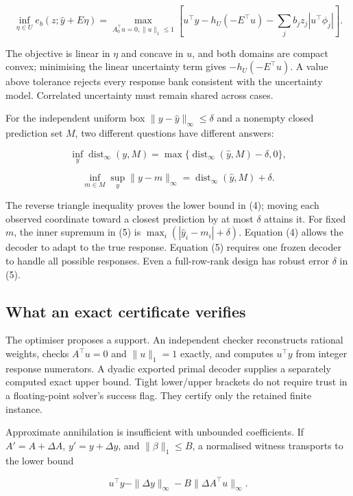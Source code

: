 \documentclass[
  british,
  11pt,
  a4paper,
]{article}
\newcounter{none} %
\begin{document}
\[
\inf_{\eta\in U}e_b(z;\widehat y+E\eta)=
\max_{A_0^\top u=0,\|u\|_1\le1}
\left[u^\top\widehat y-h_U(-E^\top u)-\sum_jb_jz_j|u^\top\phi_j|\right].
\tag{3}
\]

The objective is linear in \(\eta\) and concave in \(u\), and both
domains are compact convex; minimising the linear uncertainty term gives
\(-h_U(-E^\top u)\). A value above tolerance rejects every response bank
consistent with the uncertainty model. Correlated uncertainty must
remain shared across cases.

For the independent uniform box \(\|y-\widehat y\|_\infty\le\delta\) and
a nonempty closed prediction set \(M\), two different questions have
different answers:

\[
\inf_y\operatorname{dist}_\infty(y,M)=\max\{\operatorname{dist}_\infty(\widehat y,M)-\delta,0\},
\tag{4}
\]

\[
\inf_{m\in M}\sup_y\|y-m\|_\infty=\operatorname{dist}_\infty(\widehat y,M)+\delta.
\tag{5}
\]

The reverse triangle inequality proves the lower bound in (4); moving
each observed coordinate toward a closest prediction by at most
\(\delta\) attains it. For fixed \(m\), the inner supremum in (5) is
\(\max_i(|\widehat y_i-m_i|+\delta)\). Equation (4) allows the decoder
to adapt to the true response. Equation (5) requires one frozen decoder
to handle all possible responses. Even a full-row-rank design has robust
error \(\delta\) in (5).

\subsection{What an exact certificate
verifies}\label{what-an-exact-certificate-verifies}

The optimiser proposes a support. An independent checker reconstructs
rational weights, checks \(A^\top u=0\) and \(\|u\|_1=1\) exactly, and
computes \(u^\top y\) from integer response numerators. A dyadic
exported primal decoder supplies a separately computed exact upper
bound. Tight lower/upper brackets do not require trust in a
floating-point solver's success flag. They certify only the retained
finite instance.

Approximate annihilation is insufficient with unbounded coefficients. If
\(A'=A+\Delta A\), \(y'=y+\Delta y\), and \(\|\beta\|_1\le B\), a
normalised witness transports to the lower bound

\[u^\top y-\|\Delta y\|_\infty-B\|\Delta A^\top u\|_\infty.\]
\end{document}

